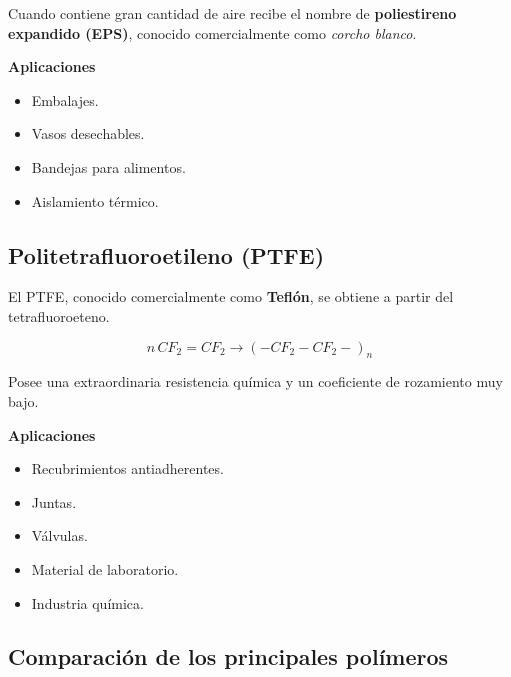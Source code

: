 Cuando contiene gran cantidad de aire recibe el nombre de
\textbf{poliestireno expandido (EPS)}, conocido comercialmente como
\emph{corcho blanco}.

\textbf{Aplicaciones}

\begin{itemize}
\item Embalajes.
\item Vasos desechables.
\item Bandejas para alimentos.
\item Aislamiento térmico.
\end{itemize}


\subsection{Politetrafluoroetileno (PTFE)}

El PTFE, conocido comercialmente como \textbf{Teflón}, se obtiene a partir del
tetrafluoroeteno.

\[
n\,CF_2=CF_2
\longrightarrow
(-CF_2-CF_2-)_n
\]

Posee una extraordinaria resistencia química y un coeficiente de rozamiento muy bajo.

\textbf{Aplicaciones}

\begin{itemize}
\item Recubrimientos antiadherentes.
\item Juntas.
\item Válvulas.
\item Material de laboratorio.
\item Industria química.
\end{itemize}


\subsection{Comparación de los principales polímeros}

